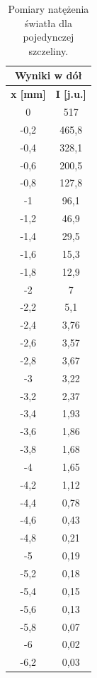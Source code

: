 \documentclass{fizykalab}
\begin{document}
\begin{table}
    \centering
    \caption{Pomiary natężenia światła dla pojedynczej szczeliny.}
    \begin{tabular}{|c|c|}
        \hline
        \multicolumn{2}{|c|}{Wyniki w dół} \\ \hline
        \textbf{x [mm]} & \textbf{I [j.u.]} \\ \hline
        0 & 517 \\ \hline
        -0,2 & 465,8 \\ \hline
        -0,4 & 328,1 \\ \hline
        -0,6 & 200,5 \\ \hline
        -0,8 & 127,8 \\ \hline
        -1 & 96,1 \\ \hline
        -1,2 & 46,9 \\ \hline
        -1,4 & 29,5 \\ \hline
        -1,6 & 15,3 \\ \hline
        -1,8 & 12,9 \\ \hline
        -2 & 7 \\ \hline
        -2,2 & 5,1 \\ \hline
        -2,4 & 3,76 \\ \hline
        -2,6 & 3,57 \\ \hline
        -2,8 & 3,67 \\ \hline
        -3 & 3,22 \\ \hline
        -3,2 & 2,37 \\ \hline
        -3,4 & 1,93 \\ \hline
        -3,6 & 1,86 \\ \hline
        -3,8 & 1,68 \\ \hline
        -4 & 1,65 \\ \hline
        -4,2 & 1,12 \\ \hline
        -4,4 & 0,78 \\ \hline
        -4,6 & 0,43 \\ \hline
        -4,8 & 0,21 \\ \hline
        -5 & 0,19 \\ \hline
        -5,2 & 0,18 \\ \hline
        -5,4 & 0,15 \\ \hline
        -5,6 & 0,13 \\ \hline
        -5,8 & 0,07 \\ \hline
        -6 & 0,02 \\ \hline
        -6,2 & 0,03 \\ \hline

\end{tabular}
\end{table}
\end{document}
